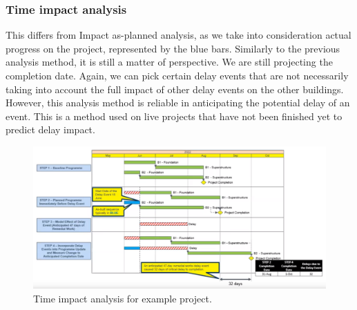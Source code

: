 \subsubsection{Time impact analysis}
This differs from Impact as-planned analysis, as we take into consideration actual progress on the project, represented by the blue bars. Similarly to the previous analysis method, it is still a matter of perspective. We are still projecting the completion date. Again, we can pick certain delay events that are not necessarily taking into account the full impact of other delay events on the other buildings. However, this analysis method is reliable in anticipating the potential delay of an event. This is a method used on live projects that have not been finished yet to predict delay impact.
\begin{figure}[H]
    \centering
    \includegraphics[width = \textwidth]{img/figure32.png}
    \caption{Time impact analysis for example project.}
\end{figure}
